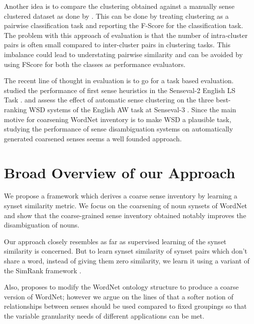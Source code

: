 Another idea is to compare the clustering obtained against a manually sense clustered dataset as done by \citep{chklovski2003exploiting}. This can be done by treating clustering as a pairwise classification task and reporting the F-Score for the classification task. The problem with this approach of evaluation is that the number of intra-cluster pairs is often small compared to inter-cluster pairs in clustering tasks. This imbalance could lead to understating pairwise similarity and can be avoided by using FScore for both the classes as performance evaluators.

The recent line of thought in evaluation is to go for a task based evaluation. \citep{mccarthy2006relating} studied the performance of first sense heuristics in the Senseval-2 English LS Task \citep{Senseval2LexicalSampleTask}. \citep{Navigli06meaningfulclustering} and \citep{snow07mergesense} assess the effect of automatic sense clustering on the three best-ranking WSD systems of the English AW task at Senseval-3 \citep{Senseval3AllWordsTask}. Since the main motive for coarsening WordNet inventory is to make WSD a plausible task, studying the performance of sense disambiguation systems on automatically generated coarsened senses seems a well founded approach.

\section{Broad Overview of our Approach}
We propose a framework which derives a coarse sense inventory by learning a synset similarity metric. We focus on the coarsening of noun synsets of WordNet and show that the coarse-grained sense inventory obtained notably improves the disambiguation of nouns.

Our approach closely resembles \citep{snow07mergesense} as far as supervised learning of the synset similarity is concerned. But to learn synset similarity of synset pairs which don't share a word, instead of giving them zero similarity, we learn it using a variant of the SimRank framework \citep{Jeh02simrank}. 

Also, \citep{snow07mergesense} proposes to modify the WordNet ontology structure to produce a coarse version of WordNet; however we argue on the lines of \citep{mccarthy2006relating} that a softer notion of relationships between senses should be used compared to fixed groupings so that the variable granularity needs of different applications can be met.

